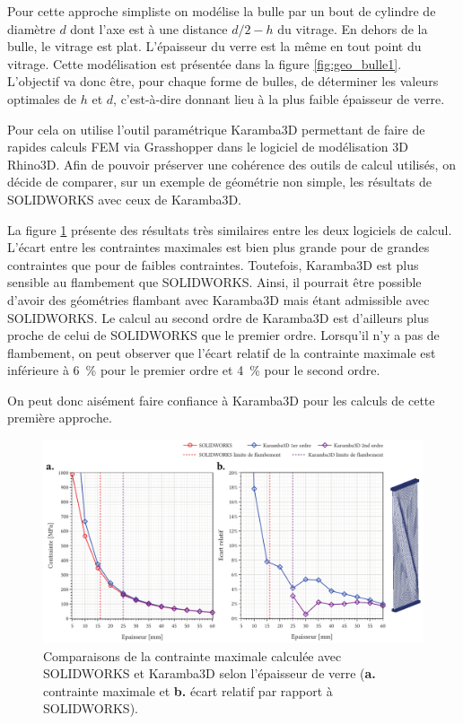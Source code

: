 \documentclass[11pt,titlepage]{article}
\begin{document}
Pour cette approche simpliste on modélise la bulle par un bout de cylindre de diamètre $d$ dont l'axe est à une distance $d/2-h$ du vitrage. En dehors de la bulle, le vitrage est plat. L'épaisseur du verre est la même en tout point du vitrage. Cette modélisation est présentée dans la figure \ref{fig:geo_bulle1}.
\\

L'objectif va donc être, pour chaque forme de bulles, de déterminer les valeurs optimales de $h$ et $d$, c'est-à-dire donnant lieu à la plus faible épaisseur de verre. 

Pour cela on utilise l'outil paramétrique Karamba3D permettant de faire de rapides calculs \acrshort{FEM} via Grasshopper dans le logiciel de modélisation 3D Rhino3D. Afin de pouvoir préserver une cohérence des outils de calcul utilisés, on décide de comparer, sur un exemple de géométrie non simple, les résultats de SOLIDWORKS avec ceux de Karamba3D.

La figure \ref{fig:comp_kar} présente des résultats très similaires entre les deux logiciels de calcul. L'écart entre les contraintes maximales est bien plus grande pour de grandes contraintes que pour de faibles contraintes. Toutefois, Karamba3D est plus sensible au flambement que SOLIDWORKS. Ainsi, il pourrait être possible d'avoir des géométries flambant avec Karamba3D mais étant admissible avec SOLIDWORKS. Le calcul au second ordre de Karamba3D est d'ailleurs plus proche de celui de SOLIDWORKS que le premier ordre. Lorsqu'il n'y a pas de flambement, on peut observer que l'écart relatif de la contrainte maximale est inférieure à \qty{6}{\percent} pour le premier ordre et \qty{4}{\percent} pour le second ordre. 

On peut donc aisément faire confiance à Karamba3D pour les calculs de cette première approche. 

\begin{figure}[H]
    \centering
    \includegraphics[width=\linewidth]{img/bulle/comp_kar.pdf}
    \caption{Comparaisons de la contrainte maximale calculée avec SOLIDWORKS et Karamba3D selon l'épaisseur de verre (\textbf{a.} contrainte maximale et \textbf{b.} écart relatif par rapport à SOLIDWORKS).}
    \label{fig:comp_kar}
\end{figure}
\end{document}
